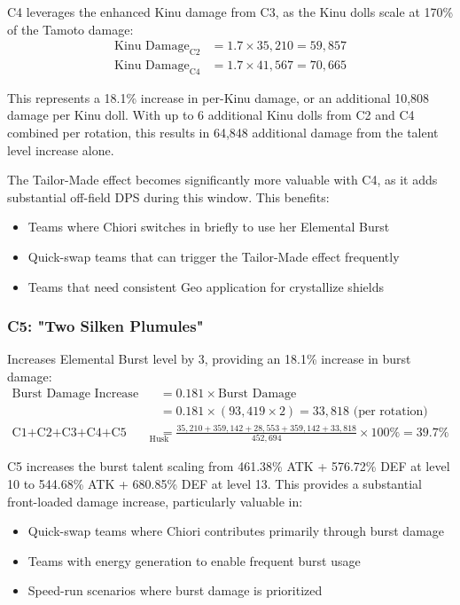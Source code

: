 \documentclass[12pt,a4paper]{article}
\begin{document}
C4 leverages the enhanced Kinu damage from C3, as the Kinu dolls scale at 170\% of the Tamoto damage:
\begin{align}
\text{Kinu Damage}_{\text{C2}} &= 1.7 \times 35,210 = 59,857 \\
\text{Kinu Damage}_{\text{C4}} &= 1.7 \times 41,567 = 70,665
\end{align}

This represents a 18.1\% increase in per-Kinu damage, or an additional 10,808 damage per Kinu doll. With up to 6 additional Kinu dolls from C2 and C4 combined per rotation, this results in 64,848 additional damage from the talent level increase alone.

The Tailor-Made effect becomes significantly more valuable with C4, as it adds substantial off-field DPS during this window. This benefits:
\begin{itemize}
    \item Teams where Chiori switches in briefly to use her Elemental Burst
    \item Quick-swap teams that can trigger the Tailor-Made effect frequently
    \item Teams that need consistent Geo application for crystallize shields
\end{itemize}

\subsubsection{C5: "Two Silken Plumules"}
Increases Elemental Burst level by 3, providing an 18.1\% increase in burst damage:
\begin{align}
\text{Burst Damage Increase} &= 0.181 \times \text{Burst Damage} \\
&= 0.181 \times (93,419 \times 2) = 33,818 \text{ (per rotation)} \\
\text{C1+C2+C3+C4+C5 Damage Increase}_{\text{Husk}} &= \frac{35,210 + 359,142 + 28,553 + 359,142 + 33,818}{452,694} \times 100\% = 39.7\%
\end{align}

C5 increases the burst talent scaling from 461.38\% ATK + 576.72\% DEF at level 10 to 544.68\% ATK + 680.85\% DEF at level 13. This provides a substantial front-loaded damage increase, particularly valuable in:
\begin{itemize}
    \item Quick-swap teams where Chiori contributes primarily through burst damage
    \item Teams with energy generation to enable frequent burst usage
    \item Speed-run scenarios where burst damage is prioritized
\end{itemize}
\end{document}
